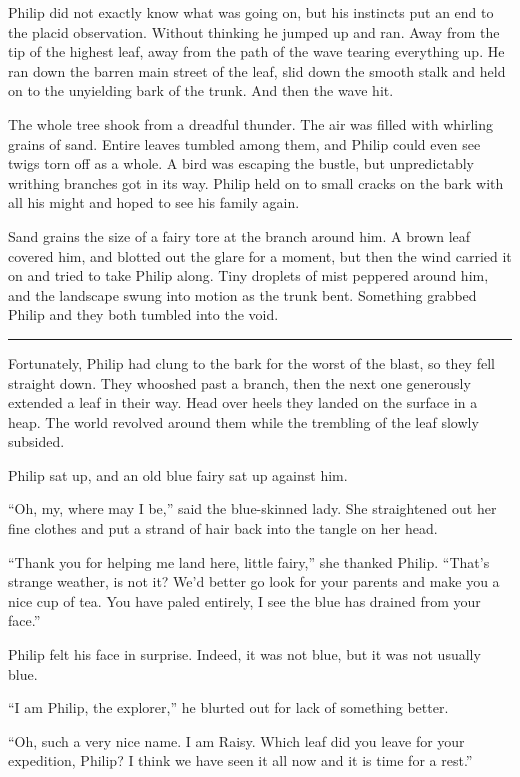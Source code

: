 \documentclass[10pt, draft]{memoir}
\renewcommand{\pfbreakdisplay}{\bigskip \ding{166} \bigskip}
\newcommand{\secbreak}{\fancybreak{\pfbreakdisplay}}
\begin{document}
Philip did not exactly know what was going on, but his instincts put an end to
the placid observation. Without thinking he jumped up and ran. Away from the
tip of the highest leaf, away from the path of the wave tearing everything up.
He ran down the barren main street of the leaf, slid down the smooth stalk and
held on to the unyielding bark of the trunk. And then the wave hit.

The whole tree shook from a dreadful thunder. The air was filled with whirling
grains of sand. Entire leaves tumbled among them, and Philip could even see
twigs torn off as a whole. A bird was escaping the bustle, but unpredictably
writhing branches got in its way. Philip held on to small cracks on the bark
with all his might and hoped to see his family again.

Sand grains the size of a fairy tore at the branch around him. A brown leaf
covered him, and blotted out the glare for a moment, but then the wind carried
it on and tried to take Philip along. Tiny droplets of mist peppered around
him, and the landscape swung into motion as the trunk bent. Something grabbed
Philip and they both tumbled into the void.

\secbreak

Fortunately, Philip had clung to the bark for the worst of the blast, so they
fell straight down. They whooshed past a branch, then the next one generously
extended a leaf in their way. Head over heels they landed on the surface in a
heap. The world revolved around them while the trembling of the leaf slowly
subsided.

Philip sat up, and an old blue fairy sat up against him.

``Oh, my, where may I be,'' said the blue-skinned lady. She straightened out
her fine clothes and put a strand of hair back into the tangle on her head.

``Thank you for helping me land here, little fairy,'' she thanked Philip.
``That's strange weather, is not it? We'd better go look for your parents and
make you a nice cup of tea. You have paled entirely, I see the blue has drained
from your face.''

Philip felt his face in surprise. Indeed, it was not blue, but it was not
usually blue.

``I am Philip, the explorer,'' he blurted out for lack of something better.

``Oh, such a very nice name. I am Raisy. Which leaf did you leave for your
expedition, Philip? I think we have seen it all now and it is time for a
rest.''
\end{document}
